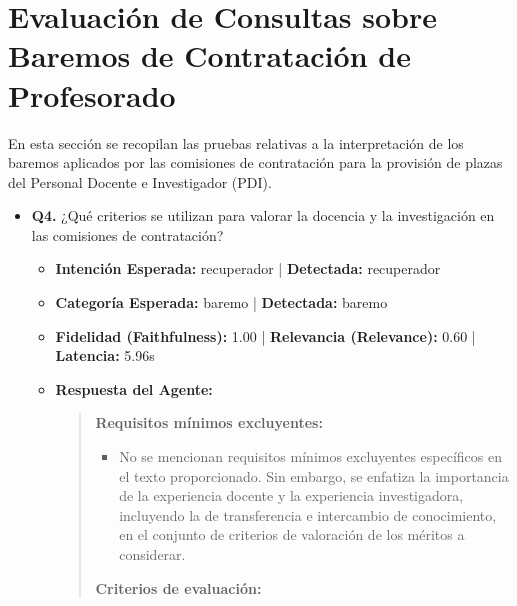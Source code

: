 \documentclass[12pt,a4paper,oneside]{report}
\begin{document}
\section{Evaluación de Consultas sobre Baremos de Contratación de Profesorado}
En esta sección se recopilan las pruebas relativas a la interpretación de los baremos aplicados por las comisiones de contratación para la provisión de plazas del Personal Docente e Investigador (PDI).

\begin{itemize}
\item \textbf{Q4.} ¿Qué criterios se utilizan para valorar la docencia y la investigación en las comisiones de contratación? \\
        \begin{itemize}
          \item \textbf{Intención Esperada:} recuperador | \textbf{Detectada:} recuperador
          \item \textbf{Categoría Esperada:} baremo | \textbf{Detectada:} baremo
          \item \textbf{Fidelidad (Faithfulness):} 1.00 | \textbf{Relevancia (Relevance):} 0.60 | \textbf{Latencia:} 5.96s
          \item \textbf{{Respuesta del Agente:}} \\
                \begin{quote}
\textbf{Requisitos mínimos excluyentes:}
\begin{itemize}
  \item No se mencionan requisitos mínimos excluyentes específicos en el texto proporcionado. Sin embargo, se enfatiza la importancia de la experiencia docente y la experiencia investigadora, incluyendo la de transferencia e intercambio de conocimiento, en el conjunto de criterios de valoración de los méritos a considerar.
\end{itemize}

\textbf{Criterios de evaluación:}


\end{quote}
\end{itemize}
\end{itemize}
\end{document}
